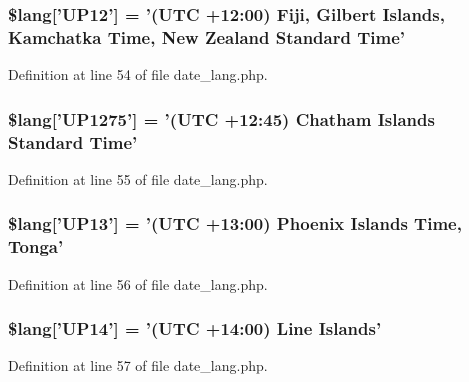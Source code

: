 \subsubsection[{\$lang}]{\setlength{\rightskip}{0pt plus 5cm}\$lang['U\-P12'] = '(U\-T\-C +12\-:00) Fiji, Gilbert Islands, Kamchatka Time, New Zealand Standard Time'}\label{date__lang_8php_a18a8bb072c3fe7db99091538ce5168be}


Definition at line 54 of file date\-\_\-lang.\-php.

\subsubsection[{\$lang}]{\setlength{\rightskip}{0pt plus 5cm}\$lang['U\-P1275'] = '(U\-T\-C +12\-:45) Chatham Islands Standard Time'}\label{date__lang_8php_a92e3c23bd9d963bbdfd21e39521bfdc1}


Definition at line 55 of file date\-\_\-lang.\-php.

\subsubsection[{\$lang}]{\setlength{\rightskip}{0pt plus 5cm}\$lang['U\-P13'] = '(U\-T\-C +13\-:00) Phoenix Islands Time, Tonga'}\label{date__lang_8php_ac197fec09ff547ca12a7fe3ffc5908ae}


Definition at line 56 of file date\-\_\-lang.\-php.

\subsubsection[{\$lang}]{\setlength{\rightskip}{0pt plus 5cm}\$lang['U\-P14'] = '(U\-T\-C +14\-:00) Line Islands'}\label{date__lang_8php_a50562230c497ebdba1f540d409110fce}


Definition at line 57 of file date\-\_\-lang.\-php.

